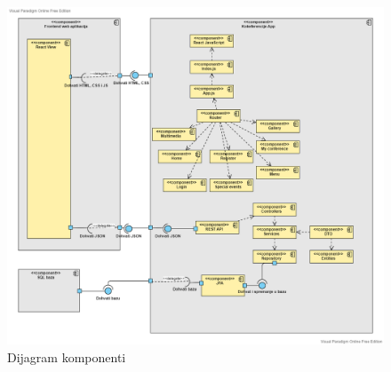 		        \begin{figure}[H]
			            \includegraphics[scale=0.40]{slike/Dijagram_komp.png} %
			            \centering
			            \caption{Dijagram komponenti}
			            \label{fig:seq-dijagram2}
		        \end{figure}\\
				\eject